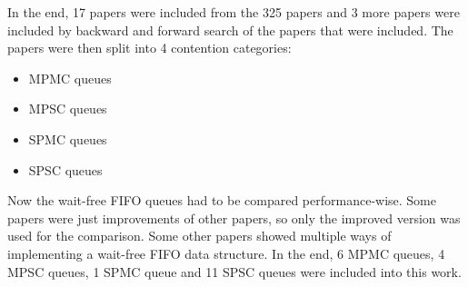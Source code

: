 In the end, 17 papers were included from the 325 papers and 3 more papers were included by backward and forward search of the papers that were included. The papers were then split into 4 contention categories:
\begin{itemize}
   \item \ac{MPMC} queues \cite{Kogan2011WaitFreeQueues,FeldmanDechevV2,RamalheteQueue,Verma2013Scalable,FastFetchAndAddWaitFreeQueue,wCQWaitFreeQueue}
   \item \ac{MPSC} queues \cite{WangCacheCoherent,jiffy,JayantiLog,Drescher2015GuardedSections}
   \item \ac{SPMC} queues \cite{Mateíspmc}
   \item \ac{SPSC} queues \cite{Lamport1983SPSCCircularBuffer,torquati2010singleproducersingleconsumerqueuessharedcache,Wang2013BQueue,MaffioneCacheAware,ffq}
\end{itemize}
Now the wait-free \ac{FIFO} queues had to be compared performance-wise. Some papers were just improvements of other papers, so only the improved version was used for the comparison. Some other papers showed multiple ways of implementing a wait-free \ac{FIFO} data structure. In the end, 6 \ac{MPMC} queues, 4 \ac{MPSC} queues, 1 \ac{SPMC} queue and 11 \ac{SPSC} queues were included into this work.